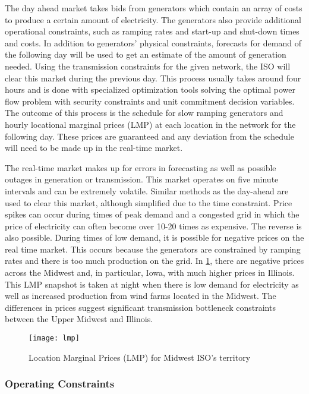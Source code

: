The day ahead market takes bids from generators which contain an array of costs to produce a certain amount of electricity.  The generators also provide additional operational constraints, such as ramping rates and start-up and shut-down times and costs.  In addition to generators' physical constraints, forecasts for demand of the following day will be used to get an estimate of the amount of generation needed.  Using the transmission constraints for the given network, the ISO will clear this market during the previous day.  This process usually takes around four hours and is done with specialized optimization tools solving the optimal power flow problem with security constraints and unit commitment decision variables.  The outcome of this process is the schedule for slow ramping generators and hourly locational marginal prices (LMP) at each location in the network for the following day.  These prices are guaranteed and any deviation from the schedule will need to be made up in the real-time market.	

The real-time market makes up for errors in forecasting as well as possible outages in generation or transmission.  This market operates on five minute intervals and can be extremely volatile.  Similar methods as the day-ahead are used to clear this market, although simplified due to the time constraint.  Price spikes can occur during times of peak demand and a congested grid in which the price of electricity can often become over 10-20 times as expensive.  The reverse is also possible.  During times of low demand, it is possible for negative prices on the real time market.  This occurs because the generators are constrained by ramping rates and there is too much production on the grid. In \cref{fig:lmpmiso}, there are negative prices across the Midwest and, in particular, Iowa, with much higher prices in Illinois.  This LMP snapshot is taken at night when there is low demand for electricity as well as increased production from wind farms located in the Midwest.  The differences in prices suggest significant transmission bottleneck constraints between the Upper Midwest and Illinois.   


\begin{figure}
\centering
\texttt{[image: lmp]}  
\caption{Location Marginal Prices (LMP) for Midwest ISO's territory}
\label{fig:lmpmiso}
\end{figure}


\subsubsection{Operating Constraints}

